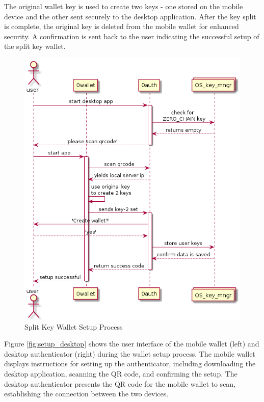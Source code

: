 The original wallet key is used to create two keys - one stored on the mobile device and the other sent securely to the desktop application. After the key split is complete, the original key is deleted from the mobile wallet for enhanced security. A confirmation is sent back to the user indicating the successful setup of the split key wallet.

\begin{figure}[h]
    \centering
    \includegraphics[width=\textwidth]{Images/setup_diagram.png}
    \caption{Split Key Wallet Setup Process}
    \label{fig:setup}
\end{figure}

Figure \ref{fig:setup_desktop} shows the user interface of the mobile wallet (left) and desktop authenticator (right) during the wallet setup process. The mobile wallet displays instructions for setting up the authenticator, including downloading the desktop application, scanning the QR code, and confirming the setup. The desktop authenticator presents the QR code for the mobile wallet to scan, establishing the connection between the two devices.


